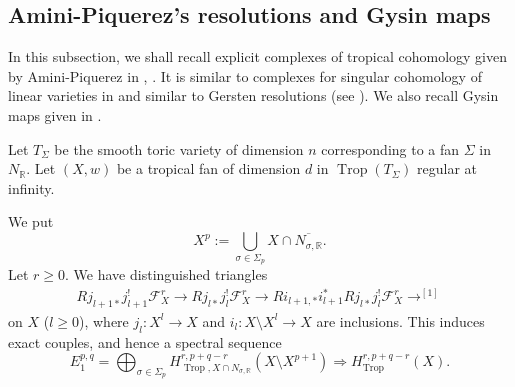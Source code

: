 \documentclass[12pt,a4]{amsart}
\def\R{\mathbb{R}}
\def\F{\mathscr{F}}
\def\Trop{\mathop{\mathrm{trop}}\nolimits}
\def\Trop{\mathop{\mathrm{Trop}}\nolimits}
\numberwithin{equation}{section}
\numberwithin{figure}{section}
\begin{document}
 \subsection{Amini-Piquerez's resolutions and Gysin maps}\label{sub:resolutions_and_gysin_maps}
  In this subsection,  we shall recall explicit complexes of tropical cohomology given by Amini-Piquerez in \cite{AminiPiquerezHomologyoftropicalfans2021}, \cite{AminiPiquerezTropicalFeichtner-Yuzvinskyandpositivitycriterionforfans2024}.
  It is similar to complexes for singular cohomology of linear varieties in \cite{TotaroChowgroupsChowcohomologyandlinearvarieties2014}  and similar to Gersten resolutions (see \cite{MikamiOntropicalcycleclassmaps2020}). 
    We also recall Gysin maps given in \cite[Remark 3.15]{AminiPiquerezHodgetheoryfortropicalvarieties2020}.

  Let $T_{\Sigma}$ be the smooth toric variety of dimension $n$ 
    corresponding to a fan $\Sigma$ in $N_\R$.
  Let $ (X, w )$ be a tropical fan of dimension $d$ in $\Trop (T_{\Sigma})$
    regular at infinity.
 
    We put 
    $$X^p:= \bigcup_{\sigma \in \Sigma_p} X \cap \overline{N_{\sigma,\R}} . $$
    Let $r\geq 0$.
   We have distinguished triangles 
   \begin{align}
     Rj_{l+1*}j_{l+1}^! \F^r_X \to Rj_{l*}j_l^! \F^r_X \to Ri_{l+1,*} i_{l+1}^* Rj_{l*}j_l^! \F^r_X \to^{[1]}   
     \label{eq. distinguished triangles inducing spectral sequence}
    \end{align}
   on $X$ ($l \geq 0$), 
   where $j_l \colon X^l \to X$ and $i_l \colon X \setminus X^l \to X$ 
    are inclusions.
  This  induces exact couples, and hence a spectral sequence 
    $$ E_1^{p,q} =  \bigoplus_{ \sigma \in \Sigma_p } 
         H^{r, p+q-r}_{\Trop, X \cap N_{\sigma,\R} } 
          (X \setminus X^{p+1})   
         \Rightarrow H^{r,p+q-r}_{\Trop} (X) .$$
\end{document}
